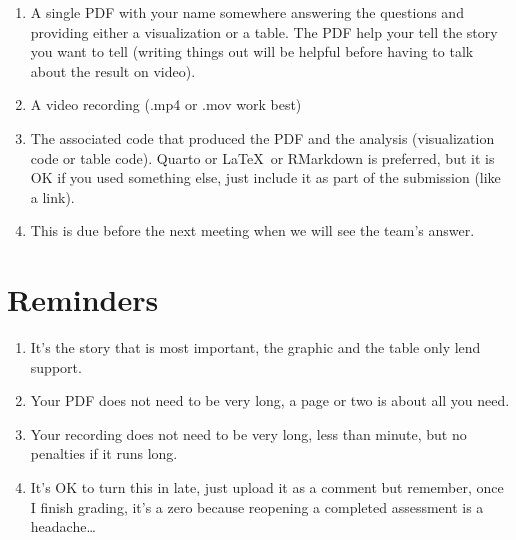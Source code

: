\documentclass[
  letterpaper,
  DIV=11,
  numbers=noendperiod]{scrartcl}
\providecommand{\tightlist}{%
  \setlength{\itemsep}{0pt}\setlength{\parskip}{0pt}}\usepackage{longtable,booktabs,array}
\begin{document}
\begin{enumerate}
\def\labelenumi{\arabic{enumi}.}
\tightlist
\item
  A single PDF with your name somewhere answering the questions and
  providing either a visualization or a table. The PDF help your tell
  the story you want to tell (writing things out will be helpful before
  having to talk about the result on video).
\item
  A video recording (.mp4 or .mov work best)
\item
  The associated code that produced the PDF and the analysis
  (visualization code or table code). Quarto or \LaTeX~or RMarkdown is
  preferred, but it is OK if you used something else, just include it as
  part of the submission (like a link).
\item
  This is due before the next meeting when we will see the team's
  answer.
\end{enumerate}

\section{Reminders}\label{reminders}

\begin{enumerate}
\def\labelenumi{\arabic{enumi}.}
\tightlist
\item
  It's the story that is most important, the graphic and the table only
  lend support.
\item
  Your PDF does not need to be very long, a page or two is about all you
  need.
\item
  Your recording does not need to be very long, less than minute, but no
  penalties if it runs long.
\item
  It's OK to turn this in late, just upload it as a comment but
  remember, once I finish grading, it's a zero because reopening a
  completed assessment is a headache\ldots{}
\end{enumerate}
\end{document}
